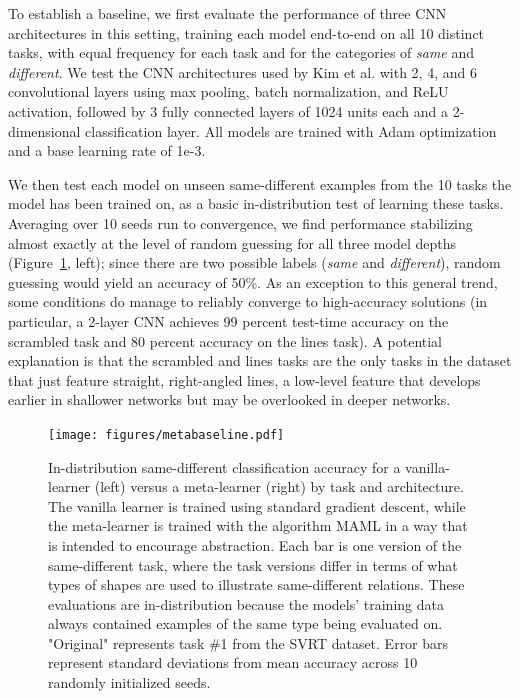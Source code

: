 \documentclass[10pt,letterpaper]{article}
\begin{document}
To establish a baseline, we first evaluate the performance of three CNN architectures in this setting, training each model end-to-end on all 10 distinct tasks, with equal frequency for each task and for the categories of \textit{same} and \textit{different}. We test the CNN architectures used by Kim et al. with 2, 4, and 6 convolutional layers using max pooling, batch normalization, and ReLU activation, followed by 3 fully connected layers of 1024 units each and a 2-dimensional classification layer. All models are trained with Adam optimization \cite{kingma2015adam} and a base learning rate of 1e-3. 

We then test each model on unseen same-different examples from the 10 tasks the model has been trained on, as a basic in-distribution test of learning these tasks. Averaging over 10 seeds run to convergence, we find performance stabilizing almost exactly at the level of random guessing for all three model depths (Figure~\ref{fig:fig4}, left); since there are two possible labels (\textit{same} and \textit{different}), random guessing would yield an accuracy of 50\%. As an exception to this general trend, some conditions do manage to reliably converge to high-accuracy solutions (in particular, a 2-layer CNN achieves 99 percent test-time accuracy on the scrambled task and 80 percent accuracy on the lines task). A potential explanation is that the scrambled and lines tasks are the only tasks in the dataset that just feature straight, right-angled lines, a low-level feature that develops earlier in shallower networks but may be overlooked in deeper networks. 

\begin{figure}[bt]
    \centering
    \texttt{[image: figures/metabaseline.pdf]}
    \caption{In-distribution same-different classification accuracy for a vanilla-learner (left) versus a meta-learner (right) by task and architecture. The vanilla learner is trained using standard gradient descent, while the meta-learner is trained with the algorithm MAML in a way that is intended to encourage abstraction. Each bar is one version of the same-different task, where the task versions differ in terms of what types of shapes are used to illustrate same-different relations. These evaluations are in-distribution because the models' training data always contained examples of the same type being evaluated on. "Original" represents task \#1 from the SVRT dataset. Error bars represent standard deviations from mean accuracy across 10 randomly initialized seeds.}
    \label{fig:fig4}
\end{figure}
\end{document}
